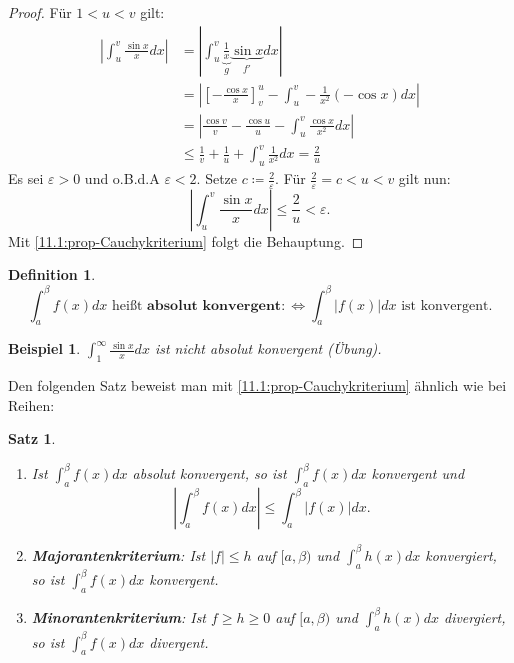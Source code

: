 \documentclass[12pt]{extreport} %
\theoremstyle{named}
\theoremstyle{itshape}
\newtheorem{satz}[unnamedtheorem]{Satz}
\newtheorem*{definition}{Definition}
\theoremstyle{normal}
\newtheorem*{beispiel*}{Beispiel}
\begin{document}
{\begin{proof}
	Für $1 < u < v$ gilt:
	\begin{align*}
		        |\int_{u}^{v} \frac{\sin x}{x} dx | & = | \int_{u}^{v} \underbrace{\frac{1}{x}}_{g} \underbrace{\sin x}_{f'} dx | \\
			& = | \left[ -\frac{\cos x}{x} \right]_{v}^{u} - \int_{u}^{v} - \frac{1}{x^{2}} (-\cos x) dx | \\
			& = | \frac{\cos v}{v} - \frac{\cos u}{u} - \int_{u}^{v} \frac{\cos x}{x^{2}} dx | \\
			& \leq \frac{1}{v} + \frac{1}{u} + \int_{u}^{v} \frac{1}{x^{2}} dx = \frac{2}{u}
	\end{align*}
	Es sei $\varepsilon > 0$ und o.B.d.A $\varepsilon < 2$. Setze $c \coloneqq \frac{2}{\varepsilon}$. Für $\frac{2}{\varepsilon}=c < u < v$ gilt nun:
	$$ | \int_{u}^{v} \frac{\sin x}{x} dx | \leq \frac{2}{u} < \varepsilon. $$
	Mit \ref{11.1:prop-Cauchykriterium} folgt die Behauptung.
\end{proof}

\begin{definition} ~\
	$$\int_{a}^{\beta} f(x) dx \text{ hei{\ss}t } \textbf{absolut konvergent} :\iff \int_{a}^{\beta} |f(x)| dx \text{ ist konvergent}.$$
\end{definition}

\begin{beispiel*}
$\int_{1}^{\infty} \frac{\sin x}{x} dx$ ist nicht absolut konvergent (Übung).
\end{beispiel*}


Den folgenden Satz beweist man mit \ref{11.1:prop-Cauchykriterium} ähnlich wie bei Reihen:

 
\begin{satz} ~\ \label{11.2:satz}
	\begin{enumerate}
		\item Ist $\int_{a}^{\beta} f(x) dx$ absolut konvergent, so ist $\int_{a}^{\beta} f(x) dx$ konvergent und
			$$ | \int_{a}^{\beta} f(x) dx | \leq \int_{a}^{\beta} |f(x)| dx. $$
		\item \textbf{Majorantenkriterium}: Ist $|f| \leq h$ auf $[a, \beta)$ und $\int_{a}^{\beta} h(x) dx$ konvergiert, so ist $\int_{a}^{\beta} f(x) dx$ konvergent.
		\item \textbf{Minorantenkriterium}: Ist $f \geq h \geq 0$ auf $[a, \beta)$ und $\int_{a}^{\beta} h(x) dx$ divergiert, so ist $\int_{a}^{\beta} f(x) dx$ divergent.
	\end{enumerate}	
\end{satz}


}
\end{document}
